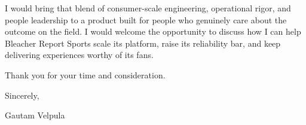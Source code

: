 \documentclass[11pt]{article}
\begin{document}
I would bring that blend of consumer-scale engineering, operational rigor, and people leadership to a product built for people who genuinely care about the outcome on the field. I would welcome the opportunity to discuss how I can help Bleacher Report Sports scale its platform, raise its reliability bar, and keep delivering experiences worthy of its fans.

Thank you for your time and consideration.

\vspace{6pt}

Sincerely,

\vspace{6pt}

Gautam Velpula
\end{document}

